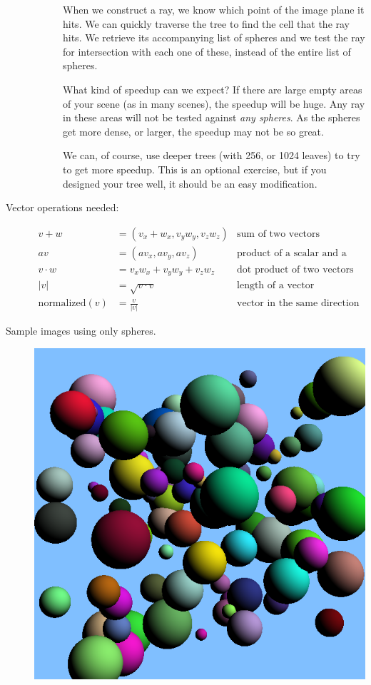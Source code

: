 \documentclass{article}
\begin{document}
\begin{description}
\begin{description}
  When we construct a ray, we know which point of the image plane it
  hits.  We can quickly traverse the tree to find the cell that the
  ray hits.  We retrieve its accompanying list of spheres and we test
  the ray for intersection with each one of these, instead of the
  entire list of spheres.

  What kind of speedup can we expect?  If there are large empty areas
  of your scene (as in many scenes), the speedup will be huge.  Any
  ray in these areas will not be tested against {\em any spheres}.  As
  the spheres get more dense, or larger, the speedup may not be so
  great. 

  We can, of course, use deeper trees (with 256, or 1024 leaves) to
  try to get more speedup.  This is an optional exercise, but if you
  designed your tree well, it should be an easy modification.

\end{description}


\item[Vector operations needed:]
  \begin{align*}
    v + w &= (v_x+w_x, v_yw_y, v_zw_z) &\mbox{sum of two vectors}\\
    av &= (av_x, av_y, av_z) & \mbox{product of a scalar and a
      vector}\\
    v \cdot w &= v_xw_x + v_yw_y + v_zw_z &\mbox{dot product of two
      vectors}\\
    |v| &= \sqrt{v\cdot v} &\mbox{length of a vector}\\
    \mbox{normalized}(v) &= \frac{v}{|v|} &\mbox{vector in the same
      direction with unit length}
    \end{align*}


\item[Sample images using only spheres.]\mbox{}

\begin{center}
      {\includegraphics[scale=0.5]{randomspheres.png}}


\end{center}
\end{description}
\end{document}
